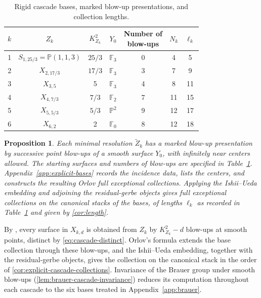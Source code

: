 \documentclass[11pt]{article}
\theoremstyle{plain}
\newtheorem{proposition}[proposition]{Proposition}
\theoremstyle{definition}
\theoremstyle{remark}
\newcommand{\Pp}{\mathbb P}
\newcommand{\F}{\mathbb F}
\begin{document}
\begin{table}[htbp]
\centering
\small
\renewcommand{\arraystretch}{1.2}
\begin{tabular}{@{}c c c c c c c@{}}
\(k\)&\(Z_k\)&\(K_{Z_k}^2\)&\(Y_0\)&\shortstack{Number of\\blow-ups}&\(N_k\)&\(\ell_k\)\\ \hline
1&\(S_{1,25/3}=\Pp(1,1,3)\)&\(25/3\)&\(\F_3\)&0&4&5\\
2&\(X_{2,17/3}\)&\(17/3\)&\(\F_3\)&3&7&9\\
3&\(X_{3,5}\)&5&\(\F_3\)&4&8&11\\
4&\(X_{4,7/3}\)&\(7/3\)&\(\F_2\)&7&11&15\\
5&\(X_{5,5/3}\)&\(5/3\)&\(\Pp^2\)&9&12&17\\
6&\(X_{6,2}\)&2&\(\F_0\)&8&12&18
\end{tabular}
\caption{Rigid cascade bases, marked blow-up presentations, and collection lengths.}
\label{tab:rigid-base-invariants}
\end{table}

\begin{proposition}\label{prop:explicit-rigid-bases}
Each minimal resolution \(\widetilde Z_k\) has a marked
blow-up presentation by successive point blow-ups of a smooth surface \(Y_0\),
with infinitely near centers allowed. The starting surfaces and numbers of
blow-ups are specified in Table~\ref{tab:rigid-base-invariants}.
Appendix~\ref{app:explicit-bases} records the incidence data, lists the
centers, and constructs the resulting Orlov full exceptional collections.
Applying the Ishii--Ueda embedding and adjoining the residual-gerbe objects
gives full exceptional collections on the canonical stacks of the bases,
of lengths \(\ell_k\) as recorded in Table~\ref{tab:rigid-base-invariants}
and given by \cref{cor:length}.
\end{proposition}

By \cite[Corollary~8(1)--(6)]{Corti2016}, every surface in \(X_{k,d}\)
is obtained from \(Z_k\) by \(K_{Z_k}^2-d\) blow-ups at smooth points,
distinct by \eqref{eq:cascade-distinct}. Orlov's formula extends the base
collection through these blow-ups, and the Ishii--Ueda embedding, together
with the residual-gerbe objects, gives the collection on the canonical
stack in the order of \cref{cor:explicit-cascade-collections}. Invariance
of the Brauer group under smooth blow-ups
(\cref{lem:brauer-cascade-invariance}) reduces its computation throughout
each cascade to the six bases treated in Appendix~\ref{app:brauer}.
\end{document}
